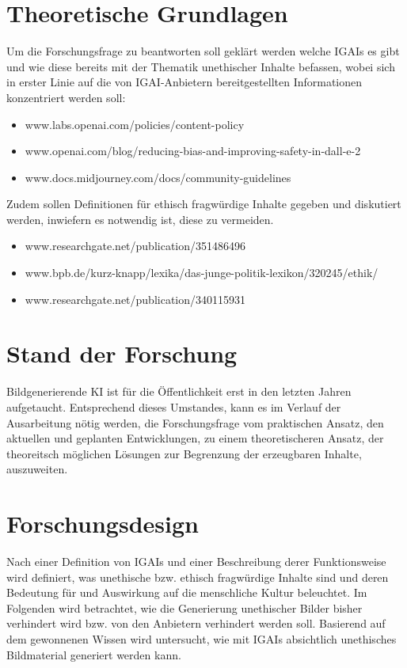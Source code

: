 \documentclass[12pt]{article}
\begin{document}
\section{Theoretische Grundlagen}
Um die Forschungsfrage zu beantworten soll geklärt werden welche IGAIs es gibt und wie diese bereits mit der Thematik unethischer Inhalte befassen, wobei sich in erster Linie auf die von IGAI-Anbietern bereitgestellten Informationen konzentriert werden soll: 
\begin{itemize}
    \item www.labs.openai.com/policies/content-policy
    \item www.openai.com/blog/reducing-bias-and-improving-safety-in-dall-e-2
    \item www.docs.midjourney.com/docs/community-guidelines

\end{itemize}
Zudem sollen Definitionen für ethisch fragwürdige Inhalte gegeben und diskutiert werden, inwiefern es notwendig ist, diese zu vermeiden.
\begin{itemize}
    \item www.researchgate.net/publication/351486496
    \item www.bpb.de/kurz-knapp/lexika/das-junge-politik-lexikon/320245/ethik/
    \item www.researchgate.net/publication/340115931
\end{itemize}
\section{Stand der Forschung}
Bildgenerierende KI ist für die Öffentlichkeit erst in den letzten Jahren aufgetaucht. Entsprechend dieses Umstandes, kann es im Verlauf der Ausarbeitung nötig werden, die Forschungsfrage vom praktischen Ansatz, den aktuellen und geplanten Entwicklungen, zu einem theoretischeren Ansatz, der theoreitsch möglichen Lösungen zur Begrenzung der erzeugbaren Inhalte, auszuweiten.
\section{Forschungsdesign}
Nach einer Definition von IGAIs und einer Beschreibung derer Funktionsweise wird definiert, was unethische bzw. ethisch fragwürdige Inhalte sind und deren Bedeutung für und Auswirkung auf die menschliche Kultur beleuchtet. Im Folgenden wird betrachtet, wie die Generierung unethischer Bilder bisher verhindert wird bzw. von den Anbietern verhindert werden soll. Basierend auf dem gewonnenen Wissen wird untersucht, wie mit IGAIs absichtlich unethisches Bildmaterial generiert werden kann.
\end{document}
